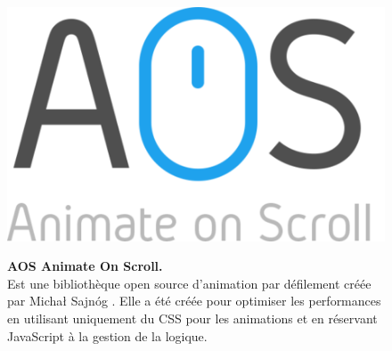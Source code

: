 \vspace{0.5cm}
\begin{figure}[H]
    \centering
    \begin{minipage}[c]{0.3\textwidth}
        \includegraphics[width=\linewidth]{projet/images/diagramme de sequance/AOS.png}
    \end{minipage}
    \hspace{1cm}
    \begin{minipage}[c]{0.6\textwidth}
        \textbf{AOS Animate On Scroll.}\\[0.5em]
    Est une bibliothèque open source d'animation par défilement créée par Michał Sajnóg . Elle a été créée pour optimiser les performances en utilisant uniquement du CSS pour les animations et en réservant JavaScript à la gestion de la logique. \cite{ref25}
    \end{minipage}
\end{figure}
\vspace{0.5cm}
